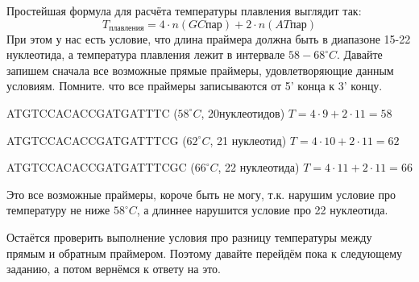 Простейшая формула для расчёта температуры плавления выглядит так:
$$T_\text{плавления} = 4 \cdot n(GC\text{пар})+2 \cdot n(AT\text{пар})$$ 
При этом у нас есть условие, что длина праймера должна быть в диапазоне 15-22 нуклеотида, а температура плавления лежит в интервале $58-68^\circ C$.
Давайте запишем сначала все возможные прямые праймеры, удовлетворяющие данным условиям. Помните. что все праймеры записываются от 5’ конца к 3’ концу. 

ATGTCCACACCGATGATTTC ($58^\circ C$, 20нуклеотидов) $T=4 \cdot 9+2 \cdot 11=58$

ATGTCCACACCGATGATTTCG ($62^\circ C$, 21 нуклеотид) $T=4 \cdot 10+2 \cdot 11=62$

ATGTCCACACCGATGATTTCGC ($66^\circ C$, 22 нуклеотида) $T=4 \cdot 11+2 \cdot 11=66$

Это все возможные праймеры, короче быть не могу, т.к. нарушим условие про температуру не ниже $58^\circ C$, а длиннее нарушится условие про 22 нуклеотида.

Остаётся проверить выполнение условия про разницу температуры между прямым и обратным праймером. Поэтому давайте перейдём пока к следующему заданию, а потом вернёмся к ответу на это.

